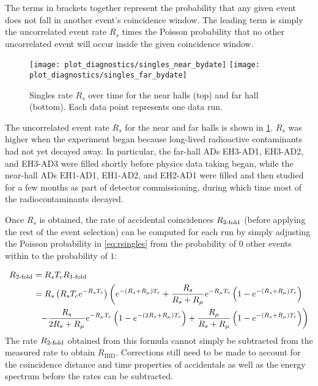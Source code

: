 The terms in brackets together represent the probability
that any given event does not fall in another event's coincidence window.
The leading term is simply the uncorrelated event rate $R_s$ times
the Poisson probability that no other uncorrelated event will occur
inside the given coincidence window.

\begin{figure}
    \texttt{[image: plot\_diagnostics/singles\_near\_bydate]}
    \texttt{[image: plot\_diagnostics/singles\_far\_bydate]}
    \caption{
        Singles rate $R_s$ over time for
        the near halls (top) and far hall (bottom).
        Each data point represents one data run.
    }
    \label{fig:singles}
\end{figure}

The uncorrelated event rate $R_s$ for the near and far halls is shown in
\cref{fig:singles}.
$R_s$ was higher when the experiment began because long-lived
radioactive contaminants had not yet decayed away.
In particular, the far-hall ADs EH3-AD1, EH3-AD2, and EH3-AD3
were filled shortly before physics data taking began,
while the near-hall ADs EH1-AD1, EH1-AD2, and EH2-AD1
were filled and then studied for a few months
as part of detector commissioning, during which time
most of the radiocontaminants decayed.

Once $R_s$ is obtained, the rate of accidental coincidences $R_{\text{\ensuremath{2}-fold}}$
(before applying the rest of the event selection)
can be computed for each run
by simply adjusting the Poisson probability in \cref{eq:rsingles}
from the probability of $0$ other events within \tc{}
to the probability of $1$:

\begin{align}
    \label{eq:racc}
    \begin{split}
        R_{\text{\fold{2}}} &= R_s\tc R_{\text{\fold{1}}} \\
                   &= R_s \left(R_s\tc e^{-R_s\tc}\right)
          \left(
              e^{-(R_s + R_\mu)\tc} +
              \frac{R_s}{R_s+R_\mu} e^{-R_\mu\tc}
              \left(
                  1 - e^{-(R_s + R_\mu)\tc}
              \right)
          \right. \\
          &\ \ %
          \left. - \frac{R_s}{2R_s + R_\mu} e^{-R_\mu\tc}
              \left(
                  1 - e^{-(2R_s + R_\mu)\tc}
              \right) +
              \frac{R_\mu}{R_s + R_\mu}
              \left(
                  1 - e^{-(R_s + R_\mu)\tc}
              \right)
          \right)
    \end{split}
\end{align}
The rate $R_{\text{\ensuremath{2}-fold}}$ obtained from this formula
cannot simply be subtracted from the measured  rate
to obtain $R_{\text{IBD}}$.
Corrections still need to be made to account for
the coincidence distance and time properties of accidentals
as well as the energy spectrum
before the rates can be subtracted.

